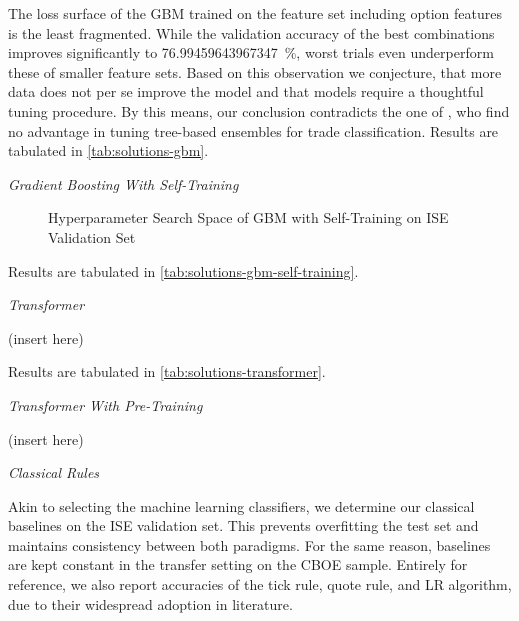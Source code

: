The loss surface of the \gls{GBM} trained on the feature set including option features is the least fragmented. While the validation accuracy of the best combinations improves significantly to \SI{76.99459643967347}{\percent}, worst trials even underperform these of smaller feature sets. Based on this observation we conjecture, that more data does not per se improve the model and that models require a thoughtful tuning procedure. By this means, our conclusion contradicts the one of \textcite[][14]{ronenMachineLearningTrade2022}, who find no advantage in tuning tree-based ensembles for trade classification. Results are tabulated in \cref{tab:solutions-gbm}.

\clearpage

\emph{Gradient Boosting With Self-Training}

\begin{figure}[!b]
    \vfill
\end{figure}

\clearpage

\begin{figure}[ht]
    \addtocounter{figure}{-1}
    \caption[]{Hyperparameter Search Space of \gls{GBM} with Self-Training on \gls{ISE} Validation Set}
    \label{fig:ise-gbm-self-training-hyperparam}
\end{figure}

Results are tabulated in \cref{tab:solutions-gbm-self-training}.

\emph{Transformer}

(insert here)

Results are tabulated in \cref{tab:solutions-transformer}.

\emph{Transformer With Pre-Training}

(insert here)

\emph{Classical Rules}

Akin to selecting the machine learning classifiers, we determine our classical baselines on the \gls{ISE} validation set. This prevents \gls{overfitting} the test set and maintains consistency between both paradigms. For the same reason, baselines are kept constant in the transfer setting on the \gls{CBOE} sample. Entirely for reference, we also report accuracies of the tick rule, quote rule, and \gls{LR} algorithm, due to their widespread adoption in literature.

